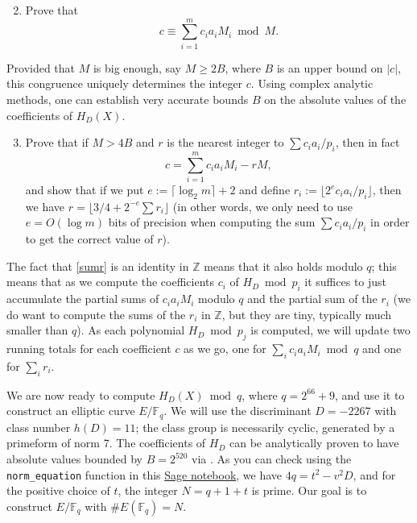 \documentclass[11pt]{article}
\newcommand{\Fq}{\mathbb{F}_q}
\newcommand{\Z}{\mathbb{Z}}
\begin{document}
\begin{enumerate}[{\bf (a)}]
\setcounter{enumi}{1}

\item Prove that
\begin{equation}\label{sum}
c\equiv\sum_{i=1}^m c_ia_iM_i\bmod M.
\end{equation}
\end{enumerate}

Provided that $M$ is big enough, say $M\ge 2B$, where $B$ is an upper bound on $|c|$, this congruence uniquely determines the integer $c$.
Using complex analytic methods, one can establish very accurate bounds $B$ on the absolute values of the coefficients of $H_D(X)$.

\begin{enumerate}[{\bf(a)}]
\setcounter{enumi}{2}
\item Prove that if $M>4B$ and $r$ is the nearest integer to $\sum c_i a_i/p_i$, then in fact
\begin{equation}\label{sumr}
c = \sum_{i=1}^m c_ia_iM_i -rM,
\end{equation}
and show that if we put $e:=\lceil \log_2 m\rceil+2$ and define $r_i:=\lfloor 2^e c_ia_i/p_i\rfloor$, then we have $r=\lfloor 3/4 + 2^{-e}\sum r_i\rfloor$ (in other words, we only need to use $e=O(\log m)$ bits of precision when computing the sum $\sum c_ia_i/p_i$ in order to get the correct value of $r$).
\end{enumerate}
The fact that \eqref{sumr} is an identity in $\Z$ means that it also holds modulo $q$; this means that as we compute the coefficients $c_i$ of $H_D\bmod p_i$ it suffices to just accumulate the partial sums of $c_ia_iM_i$ modulo $q$ and the partial sum of the $r_i$ (we do want to compute the sums of the $r_i$ in $\Z$, but they are tiny, typically much smaller than $q$).
As each polynomial $H_D\bmod p_j$ is computed, we will update two running totals for each coefficient $c$ as we go, one for $\sum_i c_ia_iM_i\bmod q$ and one for $\sum_i r_i$.

We are now ready to compute $H_D(X)\bmod q$, where $q=2^{66}+9$, and use it to construct an elliptic curve $E/\Fq$.
We will use the discriminant $D=-2267$ with class number $h(D)=11$; the class group is necessarily cyclic, generated by a primeform of norm 7.  The coefficients of $H_D$ can be analytically proven to have absolute values bounded by $B=2^{520}$ via \cite[Lemma 8]{sut}.  As you can check using the \texttt{norm\_equation} function in this \href{https://cocalc.com/share/public_paths/4283f59e7b759b1779c3a6689ed086de9b425835}{Sage notebook}, we have $4q=t^2-v^2D$, and for the positive choice of $t$, the integer $N=q+1+t$ is prime.  Our goal is to construct $E/\Fq$ with $\#E(\Fq)=N$.
\end{document}
